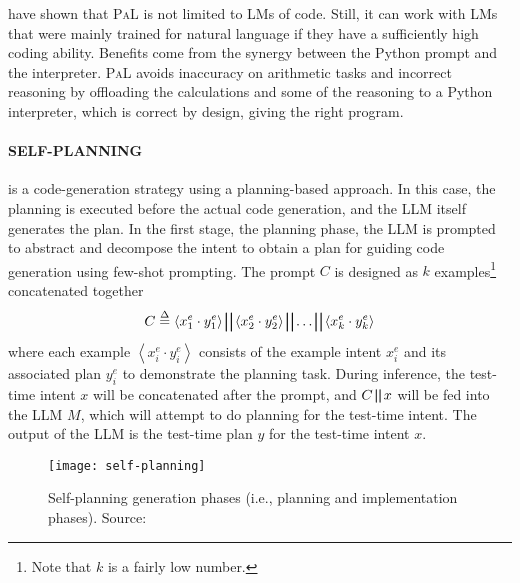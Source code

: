 \textcite{gao2022pal} have shown that \textsc{PaL} is not limited to LMs of code. Still, it can work with LMs that were mainly trained for natural language if they have a sufficiently high coding ability. Benefits come from the synergy between the Python prompt and the interpreter.
\textsc{PaL} avoids inaccuracy on arithmetic tasks and incorrect reasoning by offloading the calculations and some of the reasoning to a Python interpreter, which is correct by design, giving the right program.

\paragraph{SELF-PLANNING}
\label{par:self-planning}

is a code-generation strategy using a planning-based approach.
In this case, the planning is executed before the actual code generation, and the LLM itself generates the plan.
In the first stage, the planning phase, the LLM is prompted to abstract and decompose the intent to obtain a plan for guiding code generation using few-shot prompting.
The prompt $C$ is designed as $k$ examples\footnote{Note that $k$ is a fairly low number.} concatenated together
\begin{equation}
	C \stackrel{\Delta}{=} \left\langle x^e_1 \cdot y^e_1 \right\rangle \bigparallel \left\langle x^e_2 \cdot y^e_2 \right\rangle \bigparallel \ldots \bigparallel \left\langle x^e_k \cdot y^e_k \right\rangle
	\label{eq:self-planning-eq}
\end{equation}
where each example $\left\langle x^e_i \cdot y^e_i \right\rangle$ consists of the example intent $x^e_i$ and its associated plan $y^e_i$ to demonstrate the planning task.
During inference, the test-time intent $x$ will be concatenated after the prompt, and $C \bigparallel x$ will be fed into the LLM $M$, which will attempt to do planning for the test-time intent.
The output of the LLM is the test-time plan $y$ for the test-time intent $x$.

\begin{figure}[h!]
	\centering
	\texttt{[image: self-planning]}
	\caption{Self-planning generation phases (i.e., planning and implementation phases). Source: \textcite{jiang2024selfplanning}}
	\label{fig:self-planning}
\end{figure}

